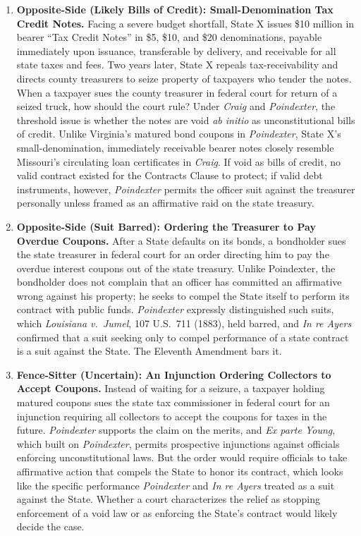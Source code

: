 \documentclass[12pt]{article}
\begin{document}
\begin{enumerate}
\item \textbf{Opposite-Side (Likely Bills of Credit): Small-Denomination Tax Credit Notes.} Facing a severe budget shortfall, State X issues \$10 million in bearer ``Tax Credit Notes'' in \$5, \$10, and \$20 denominations, payable immediately upon issuance, transferable by delivery, and receivable for all state taxes and fees. Two years later, State X repeals tax-receivability and directs county treasurers to seize property of taxpayers who tender the notes. When a taxpayer sues the county treasurer in federal court for return of a seized truck, how should the court rule? Under \textit{Craig} and \textit{Poindexter}, the threshold issue is whether the notes are void \textit{ab initio} as unconstitutional bills of credit. Unlike Virginia's matured bond coupons in \textit{Poindexter}, State X's small-denomination, immediately receivable bearer notes closely resemble Missouri's circulating loan certificates in \textit{Craig}. If void as bills of credit, no valid contract existed for the Contracts Clause to protect; if valid debt instruments, however, \textit{Poindexter} permits the officer suit against the treasurer personally unless framed as an affirmative raid on the state treasury.

\item \textbf{Opposite-Side (Suit Barred): Ordering the Treasurer to Pay Overdue Coupons.} After a State defaults on its bonds, a bondholder sues the state treasurer in federal court for an order directing him to pay the overdue interest coupons out of the state treasury. Unlike Poindexter, the bondholder does not complain that an officer has committed an affirmative wrong against his property; he seeks to compel the State itself to perform its contract with public funds. \textit{Poindexter} expressly distinguished such suits, which \textit{Louisiana v.\ Jumel}, 107 U.S.\ 711 (1883), held barred, and \textit{In re Ayers} confirmed that a suit seeking only to compel performance of a state contract is a suit against the State. The Eleventh Amendment bars it.

\item \textbf{Fence-Sitter (Uncertain): An Injunction Ordering Collectors to Accept Coupons.} Instead of waiting for a seizure, a taxpayer holding matured coupons sues the state tax commissioner in federal court for an injunction requiring all collectors to accept the coupons for taxes in the future. \textit{Poindexter} supports the claim on the merits, and \textit{Ex parte Young}, which built on \textit{Poindexter}, permits prospective injunctions against officials enforcing unconstitutional laws. But the order would require officials to take affirmative action that compels the State to honor its contract, which looks like the specific performance \textit{Poindexter} and \textit{In re Ayers} treated as a suit against the State. Whether a court characterizes the relief as stopping enforcement of a void law or as enforcing the State's contract would likely decide the case.

\end{enumerate}
\end{document}

